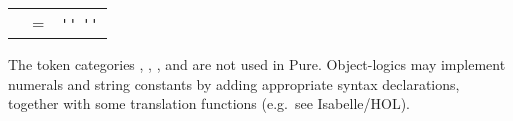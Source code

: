 \begin{isabellebody}
\begin{isamarkuptext}
\begin{center}
\begin{supertabular}{rcl}
    \hypertarget{syntax.inner.xstr}{\hyperlink{syntax.inner.xstr}{\mbox{}}} & = & \verb|''|  \verb|''| \\
  \end{supertabular}
  \end{center}

  The token categories \hyperlink{syntax.inner.num}{\mbox{}}, \hyperlink{syntax.inner.float-token}{\mbox{}}, \hyperlink{syntax.inner.xnum}{\mbox{}}, and \hyperlink{syntax.inner.xstr}{\mbox{}} are
  not used in Pure.  Object-logics may implement numerals and string
  constants by adding appropriate syntax declarations, together with
  some translation functions (e.g.\ see Isabelle/HOL).


\end{isamarkuptext}
\end{isabellebody}
